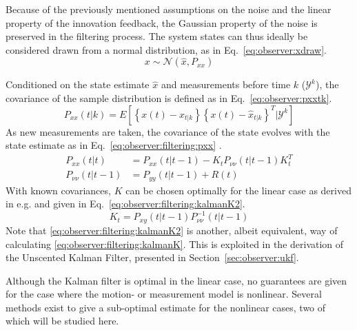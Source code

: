     Because of the previously mentioned assumptions on the noise and the linear property
    of the innovation feedback, the Gaussian property of the noise is preserved
    in the filtering process. The system states can thus ideally
    be considered drawn from a normal distribution, as in Eq.~\eqref{eq:observer:xdraw}.
    \begin{equation}
        \label{eq:observer:xdraw}
        x \sim \mathcal{N}\left(\hat{x}, P_{xx}\right)
    \end{equation}

    Conditioned on the state estimate $\hat{x}$ and measurements before time $k$ ($\mathcal{Y}^{k}$), the
    covariance of the sample distribution is defined as in Eq.~\eqref{eq:observer:pxxtk}.
    \begin{equation}
        \label{eq:observer:pxxtk}
        P_{xx}(t|k) = E \left[ \left\lbrace x(t) - \hat{x}_{t|k} \right\rbrace
                               \left\lbrace x(t) - \hat{x}_{t|k} \right\rbrace^{T}
                               | \mathcal{Y}^{k} \right]
    \end{equation}
    As new measurements are taken, the covariance of the state evolves
    with the state estimate as in Eq.~\eqref{eq:observer:filtering:pxx} \citep{Julier95anewapproach}.
    \begin{align}
        P_{xx}(t|t) &= P_{xx}(t|t-1) - K_{t}P_{\nu\nu}(t|t-1)K_{t}^{T} \label{eq:observer:filtering:pxx} \\
        P_{\nu\nu}(t|t-1) &= P_{yy}(t|t-1) + R(t) \label{eq:observer:filtering:pnunu}
    \end{align}
    With known covariances, $K$ can be chosen optimally for the linear case as derived in e.g. \citep{gustafsson2010statistical}
    and given in Eq.~\eqref{eq:observer:filtering:kalmanK2}.
    \begin{equation}
        \label{eq:observer:filtering:kalmanK2}
        K_{t} = P_{xy}(t|t-1)P_{\nu\nu}^{-1}(t|t-1)
    \end{equation}
    Note that \eqref{eq:observer:filtering:kalmanK2} is another, albeit equivalent,
    way of calculating \eqref{eq:observer:filtering:kalmanK}. This is exploited
    in the derivation of the Unscented Kalman Filter, presented in Section~\ref{sec:observer:ukf}.

    Although the Kalman filter is optimal in the linear case, no guarantees
    are given for the case where the motion- or measurement model is nonlinear.
    Several methods exist to give a sub-optimal estimate for the nonlinear cases,
    two of which will be studied here.

